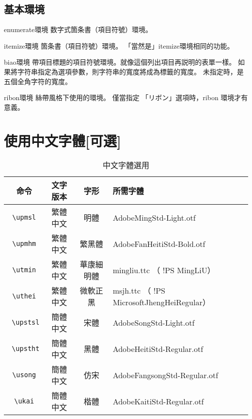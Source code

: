 \documentclass[a4,11pt,uplatex,openleft]{jsarticle}
\DeclareRobustCommand\upstht{\kanjifamily{upstht}\selectfont}
\begin{document}
\subsection{基本環境}

\begin{biao}[　　　  　　　　　]
\item[enumerate環境]数字式箇条書（項目符號）環境。

\item[itemize環境]\makebox[1zw][c]{\textbullet}箇条書（項目符號）環境。
「當然是」itemize環境相同的功能。
\item[biao環境]帶項目標題的項目符號環境。就像這個列出項目再説明的表單一樣。
如果將字符串指定為選項參數，則字符串的寬度將成為標籤的寬度。
未指定時，是五個全角字符的寬度。
\item[ribon環境] 絲帶風格下使用的環境。
僅當指定 「リボン」選項時，ribon 環境才有意義。
\end{biao}


\section{使用中文字體[可選]}

\begin{table}[h]
\caption{\fontsize{12pt}{15pt}\selectfont 中文字體選用} %
\centering %
\begin{tabular}{|c|c|c|p{7cm}|}%

\hline
命令    & 文字版本   & 字形    & 所需字體 \\
\hline
\verb+ \upmsl + & 繁體中文 &  明體    &    AdobeMingStd-Light.otf \\
\hline
\verb+ \upmhm + & 繁體中文 & 繁黑體   &   AdobeFanHeitiStd-Bold.otf \\
\hline
\verb+ \utmin + & 繁體中文 & 華康細明體 & mingliu.ttc （ !PS MingLiU） \\
\hline
\verb+ \uthei + & 繁體中文 & 微軟正黑  &  msjh.ttc  （ !PS MicrosoftJhengHeiRegular）\\
\hline
\verb+ \upstsl + & 簡體中文 &  宋體    &    AdobeSongStd-Light.otf\\
\hline
\verb+ \upstht + & 簡體中文 & 黑體  &      AdobeHeitiStd-Regular.otf\\
\hline
\verb+ \usong + & 簡體中文 & 仿宋   &     AdobeFangsongStd-Regular.otf\\
\hline
\verb+ \ukai + & 簡體中文 & 楷體     &   AdobeKaitiStd-Regular.otf \\
\hline

\end{tabular}
\end{table}
\end{document}
